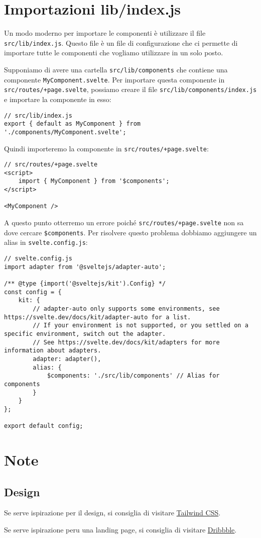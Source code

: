\documentclass[12pt]{article}
\begin{document}
\section{Importazioni lib/index.js}
Un modo moderno per importare le componenti 
è utilizzare il file \texttt{src/lib/index.js}.
Questo file è un file di configurazione che
ci permette di importare tutte le componenti
che vogliamo utilizzare in un solo posto.

Supponiamo di avere una cartella \texttt{src/lib/components}
che contiene una componente \texttt{MyComponent.svelte}.
Per importare questa componente in \texttt{src/routes/+page.svelte},
possiamo creare il file \texttt{src/lib/components/index.js} e importare
la componente in esso:
\begin{verbatim}
// src/lib/index.js
export { default as MyComponent } from './components/MyComponent.svelte';
\end{verbatim}
Quindi importeremo la componente in \texttt{src/routes/+page.svelte}:
\begin{verbatim}
// src/routes/+page.svelte
<script>
    import { MyComponent } from '$components';
</script>

<MyComponent />
\end{verbatim}

A questo punto otterremo un errore poiché 
\texttt{src/routes/+page.svelte} non sa dove cercare
\texttt{\$components}. Per risolvere questo problema
dobbiamo aggiungere un alias in \texttt{svelte.config.js}:
\begin{verbatim}
// svelte.config.js
import adapter from '@sveltejs/adapter-auto';

/** @type {import('@sveltejs/kit').Config} */
const config = {
	kit: {
		// adapter-auto only supports some environments, see https://svelte.dev/docs/kit/adapter-auto for a list.
		// If your environment is not supported, or you settled on a specific environment, switch out the adapter.
		// See https://svelte.dev/docs/kit/adapters for more information about adapters.
		adapter: adapter(),
		alias: {
			$components: './src/lib/components' // Alias for components
		}
	}
};

export default config;
\end{verbatim}

















\pagebreak
\section{Note}
\subsection{Design}
Se serve ispirazione per il design, si consiglia di visitare
\href{https://www.tailwindcss.com}{Tailwind CSS}.

Se serve ispirazione peru una landing page, si consiglia di visitare
\href{https://dribbble.com}{Dribbble}.
\end{document}
